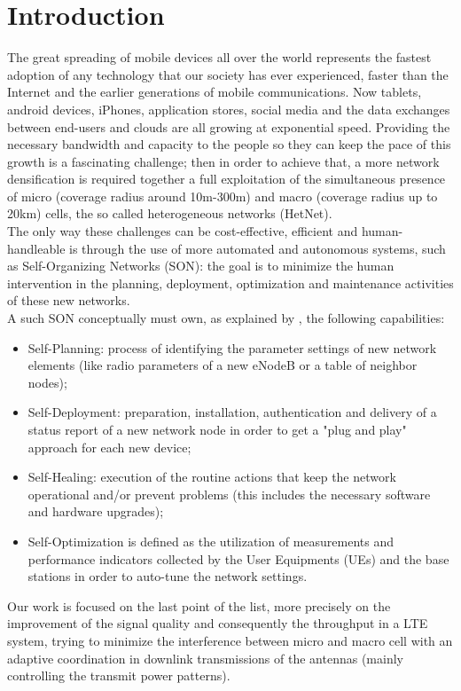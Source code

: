 \documentclass[conference,10pt]{IEEEtran}
\begin{document}
\section{Introduction}\label{sec:intro}
The great spreading of mobile devices all over the world represents the fastest adoption of any technology that
our society has ever experienced, faster than the Internet and the earlier generations of mobile
communications. Now tablets, android devices, iPhones, application stores, social media and the data
exchanges between end-users and clouds are all growing at exponential speed. Providing the necessary bandwidth and capacity to the people so they can keep the pace of this growth is a fascinating challenge; then in order to achieve that, a more network densification is required together a full exploitation of the simultaneous presence of micro (coverage radius around 10m-300m) and macro (coverage radius up to 20km) cells, the so called heterogeneous networks (HetNet).\\
The only way these challenges can be cost-effective, efficient and human-handleable is through the use of more automated and autonomous systems, such as Self-Organizing Networks (SON): the goal is to minimize the human intervention in the planning, deployment, optimization and maintenance activities of these new networks.\\
A such SON conceptually must own, as explained by \cite{ramiro2011self}, the following capabilities:
\begin{itemize}
\item Self-Planning: process of identifying the parameter settings of new network elements (like radio parameters of a new eNodeB or a table of neighbor nodes);
\item Self-Deployment: preparation, installation, authentication and delivery of a status report of
a new network node in order to get a "plug and play" approach for each new device;
\item Self-Healing: execution of the routine actions that keep the network operational and/or
prevent problems (this includes the necessary software and hardware upgrades);
\item Self-Optimization is defined as the utilization of measurements and performance indicators
collected by the User Equipments (UEs) and the base stations in order to auto-tune the network
settings.
\end{itemize}
Our work is focused on the last point of the list, more precisely on the improvement of the signal quality and consequently the throughput in a LTE system, trying to minimize the interference between micro and macro cell with an adaptive coordination in downlink transmissions of the antennas (mainly controlling the transmit power patterns).\\
\end{document}
